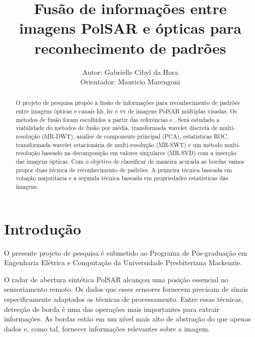 \documentclass[runningheads]{llncs}
\begin{document}
%
\title{Fusão de informações entre imagens PolSAR e ópticas para reconhecimento de padrões}
%
%
\pagestyle{plain}
\author{Autor: Gabrielle Cibyl da Hora \\ 
Orientador: Mauricio Marengoni} 
%
%
%
\maketitle              %
%
\begin{abstract}
O projeto de pesquisa propõe a fusão de informações para reconhecimento de padrões entre imagens ópticas e canais hh, hv e vv de imagens PolSAR múltiplas visadas. Os métodos de fusão foram escolhidos a partir das referências \cite{bmf_2020} e \cite{ref_proc3}.  Será estudado a viabilidade do métodos de fusão por média, transformada wavelet discreta de multi-resolução (MR-DWT), análise de componente principal (PCA), estatísticas ROC, transformada wavelet estacionária de multi-resolução (MR-SWT) e um método multi-resolução baseado na decomposição em valores singulares (MR-SVD) com a inserção das imagens ópticas. Com o objetivo de classificar de maneira acurada as bordas vamos propor duas técnica de reconhecimento de padrões. A primeira técnica baseada em votação majoritária e a segunda técnica baseada em propriedades estatísticas das imagens. 

\addto\captionsenglish{\renewcommand{\keywordsname}{Palavras-chave}}
\end{abstract}
%
%
\section{Introdução}

O presente projeto de pesquisa é submetido ao Programa de Pós-graduação em Engenharia Elétrica e Computação da Universidade Presbiteriana Mackenzie. 

O radar de abertura sintética PolSAR alcançou uma posição essencial no sensoriamento remoto. Os dados que esses sensores fornecem precisam de sinais especificamente adaptados as técnicas de processamento. Entre essas técnicas, detecção de borda é uma das operações mais importantes para extrair informações. As bordas estão em um nível mais alto de abstração do que apenas dados e, como tal, fornecer informações relevantes sobre a imagem.
\end{document}
